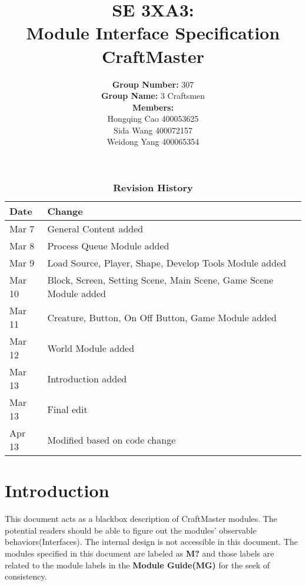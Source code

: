 \documentclass{article}
\begin{document}
\title{\textbf{SE 3XA3: \\Module Interface Specification\\CraftMaster}}

\author{\textbf{Group Number: }307\\
		\textbf{Group Name: }3 Craftsmen \\
		\textbf{Members: }\\
		Hongqing Cao 400053625\\
		Sida Wang	 400072157\\
		Weidong Yang 400065354}

\date{}

\maketitle
\newpage
{}
\tableofcontents
\listoftables
\listoffigures
\newpage
\FloatBarrier
\begin{table}
\begin{tabularx}{\textwidth}{lX}
\toprule
\textbf{Date} & \textbf{Change}\\
\midrule
Mar 7 & General Content added\\
Mar 8 & Process Queue Module added\\
Mar 9 & Load Source, Player, Shape, Develop Tools Module added\\
Mar 10 & Block, Screen, Setting Scene, Main Scene, Game Scene Module added\\
Mar 11 & Creature, Button, On Off Button, Game Module added\\
Mar 12 & World Module added\\
Mar 13 & Introduction added\\
Mar 13 & Final edit\\
Apr 13 & Modified based on code change\\
\bottomrule
\end{tabularx}
\caption{\textbf{Revision History}} \label{TblRevisionHistory}
\end{table}
\FloatBarrier
\newpage
\section*{Introduction}
This document acts as a blackbox description of CraftMaster modules. The potential readers should be able to figure out the modules' observable behaviors(Interfaces). The internal design is not accessible in this document. The modules specified in this document are labeled as \textbf{M?} and those labels are related to the module labels in the \textbf{Module Guide(MG)} for the seek of consistency.\\
\end{document}
